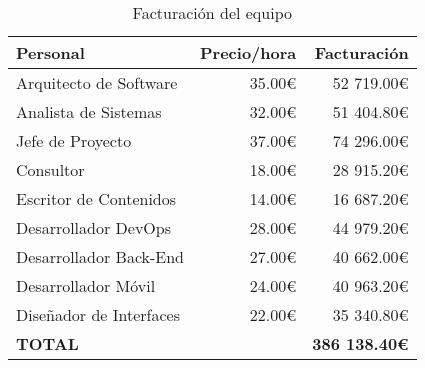 \begin{table}[H]
    \centering
    \caption{Medios de producción}
    \label{pre:medios_produccion}
\end{table}

\begin{table}[H]
    \centering
    \begin{tabular}{l r r}
        \hline
        Personal & Precio/hora & Facturación \\
        \hline
        Arquitecto de Software & 35.00€ & 52 719.00€ \\  
        Analista de Sistemas & 32.00€ & 51 404.80€ \\  
        Jefe de Proyecto & 37.00€ & 74 296.00€ \\  
        Consultor & 18.00€ & 28 915.20€ \\  
        Escritor de Contenidos & 14.00€ & 16 687.20€ \\  
        Desarrollador DevOps & 28.00€ & 44 979.20€ \\  
        Desarrollador Back-End & 27.00€ & 40 662.00€ \\  
        Desarrollador Móvil & 24.00€ & 40 963.20€ \\  
        Diseñador de Interfaces & 22.00€ & 35 340.80€ \\  
        \hline
        \textbf{TOTAL}               & & \textbf{386 138.40€} \\
    \end{tabular}
    \caption{Facturación del equipo}
    \label{pre:facturacion}
\end{table}

